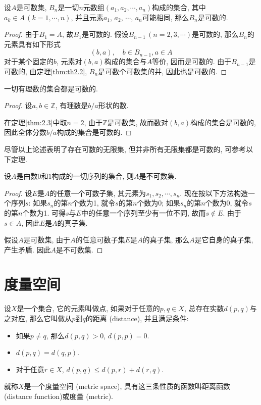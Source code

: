 \documentclass[cn,12pt,math=mtpro2,citestyle=gb7714-2015,bibstyle=gb7714-2015,twocol]{elegantbook}
\begin{document}
\begin{theorem}\label{thm:2.3}
  设$A$是可数集, $B_n$是一切$n$元数组$(a_1,a_2,\cdots,a_n)$构成的集合, 其中$a_k\in A\, (k=1,\cdots,n)$, 并且元素$a_1$, $a_2$, $\cdots$, $a_n$可能相同, 那么$B_n$是可数的.
\end{theorem}
\begin{proof}
  由于$B_1=A$, 故$B_1$是可数的. 假设$B_{n-1}\, (n=2,3,\cdots)$是可数的, 那么$B_{n}$的元素具有如下形式
  $$(b,a),\quad b\in B_{n-1}, a\in A$$
  对于某个固定的$b$, 元素对$(b,a)$构成的集合与$A$等价, 因而是可数的. 由于$B_{n-1}$是可数的, 由定理\ref{thm:th2.2}, $B_{n}$是可数个可数集的并, 因此也是可数的.

\end{proof}

\begin{corollary}
一切有理数的集合都是可数的.
\end{corollary}
\begin{proof}
   设$a, b \in \mathbb{Z}$, 有理数是$b/a$形状的数.

   在定理\ref{thm:2.3}中取$n=2$, 由于$\mathbb{Z}$是可数集, 故而数对$(b,a)$构成的集合是可数的, 因此全体分数$b/a$构成的集合是可数的.

\end{proof}

尽管以上论述表明了存在可数的无限集, 但并非所有无限集都是可数的, 可参考以下定理.
\begin{theorem}
设$A$是由数$0$和$1$构成的一切序列的集合, 则$A$是不可数集.
\end{theorem}
\begin{proof}
  设$E$是$A$的任意一个可数子集, 其元素为$s_1, s_2, \cdots, s_n$. 现在按以下方法构造一个序列$s$: 如果$s_n$的第$n$个数为1, 就令$s$的第$n$个数为0; 如果$s_n$的第$n$个数为0, 就令$s$的第$n$个数为1. 可得$s$与$E$中的任意一个序列至少有一位不同, 故而$s\notin E$. 由于$s\in A$, 因此$E$是$A$的真子集.

  假设$A$是可数集, 由于$A$的任意可数子集$E$是$A$的真子集, 那么$A$是它自身的真子集, 产生矛盾. 因此$A$是不可数集.

\end{proof}
\section{度量空间}
\begin{definition}\label{def:def1}
设$X$是一个集合, 它的元素叫做点, 如果对于任意的$p, q \in X$, 总存在实数$d(p,q)$与之对应, 那么它叫做从$p$到$q$的距离 (distance), 并且满足条件:
\begin{itemize}
\item 如果$p\neq q$, 那么$d(p,q)>0$, $d(p,p)=0$.

\item $d(p,q)=d(q,p)$.

\item 对于任意$r\in X$, $d(p,q)\leq d(p,r)+d(r,q)$.
\end{itemize}
就称$X$是一个度量空间 (metric space), 具有这三条性质的函数叫距离函数 (distance function)或度量 (metric).
\end{definition}
\end{document}
